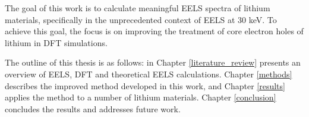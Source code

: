 The goal of this work is to calculate meaningful EELS spectra of lithium materials, specifically in the unprecedented context of EELS at 30 keV. To achieve this goal, the focus is on improving the treatment of core electron holes of lithium in DFT simulations. 

The outline of this thesis is as follows: in Chapter \ref{literature_review} presents an overview of EELS, DFT and theoretical EELS calculations.  Chapter \ref{methods} describes the improved method developed in this work, and Chapter \ref{results} applies the method to a number of lithium materials.  Chapter \ref{conclusion} concludes the results and addresses future work.


